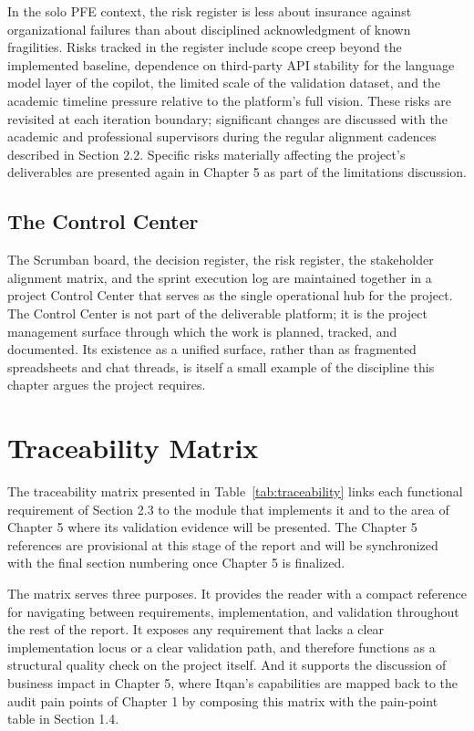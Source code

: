 In the solo PFE context, the risk register is less about insurance against organizational failures than about disciplined acknowledgment of known fragilities. Risks tracked in the register include scope creep beyond the implemented baseline, dependence on third-party API stability for the language model layer of the copilot, the limited scale of the validation dataset, and the academic timeline pressure relative to the platform's full vision. These risks are revisited at each iteration boundary; significant changes are discussed with the academic and professional supervisors during the regular alignment cadences described in Section 2.2. Specific risks materially affecting the project's deliverables are presented again in Chapter 5 as part of the limitations discussion.

\subsection*{The Control Center}
The Scrumban board, the decision register, the risk register, the stakeholder alignment matrix, and the sprint execution log are maintained together in a project Control Center that serves as the single operational hub for the project. The Control Center is not part of the deliverable platform; it is the project management surface through which the work is planned, tracked, and documented. Its existence as a unified surface, rather than as fragmented spreadsheets and chat threads, is itself a small example of the discipline this chapter argues the project requires.

\section{Traceability Matrix}
The traceability matrix presented in Table~\ref{tab:traceability} links each functional requirement of Section 2.3 to the module that implements it and to the area of Chapter 5 where its validation evidence will be presented. The Chapter 5 references are provisional at this stage of the report and will be synchronized with the final section numbering once Chapter 5 is finalized.

The matrix serves three purposes. It provides the reader with a compact reference for navigating between requirements, implementation, and validation throughout the rest of the report. It exposes any requirement that lacks a clear implementation locus or a clear validation path, and therefore functions as a structural quality check on the project itself. And it supports the discussion of business impact in Chapter 5, where Itqan's capabilities are mapped back to the audit pain points of Chapter 1 by composing this matrix with the pain-point table in Section 1.4.

